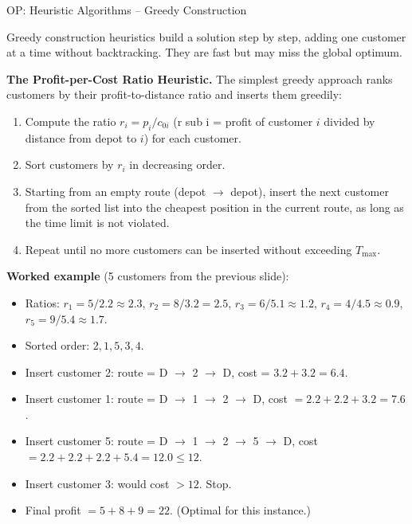 \documentclass[aspectratio=169,10pt]{beamer}
\begin{document}
\begin{frame}[allowframebreaks]{OP: Heuristic Algorithms -- Greedy Construction}

  Greedy construction heuristics build a solution step by step, adding
  one customer at a time without backtracking.
  They are fast but may miss the global optimum.

  \medskip
  \textbf{The Profit-per-Cost Ratio Heuristic.}
  The simplest greedy approach ranks customers by their profit-to-distance
  ratio and inserts them greedily:

  \medskip
  \begin{enumerate}
    \item Compute the ratio $r_i = p_i / c_{0i}$ (r sub i = profit of
          customer $i$ divided by distance from depot to $i$) for each
          customer.
    \item Sort customers by $r_i$ in decreasing order.
    \item Starting from an empty route (depot $\to$ depot), insert the
          next customer from the sorted list into the cheapest position
          in the current route, as long as the time limit is not violated.
    \item Repeat until no more customers can be inserted without
          exceeding $T_{\max}$.
  \end{enumerate}

  \medskip
  \textbf{Worked example} (5 customers from the previous slide):
  \begin{itemize}
    \item Ratios: $r_1 = 5/2.2 \approx 2.3$,\;
                  $r_2 = 8/3.2 = 2.5$,\;
                  $r_3 = 6/5.1 \approx 1.2$,\;
                  $r_4 = 4/4.5 \approx 0.9$,\;
                  $r_5 = 9/5.4 \approx 1.7$.
    \item Sorted order: $2, 1, 5, 3, 4$.
    \item Insert customer 2: route = D $\to$ 2 $\to$ D, cost = $3.2 + 3.2 = 6.4$.
    \item Insert customer 1: route = D $\to$ 1 $\to$ 2 $\to$ D,
          cost $= 2.2 + 2.2 + 3.2 = 7.6$.
    \item Insert customer 5: route = D $\to$ 1 $\to$ 2 $\to$ 5 $\to$ D,
          cost $= 2.2 + 2.2 + 2.2 + 5.4 = 12.0 \le 12$. \checkmark
    \item Insert customer 3: would cost $> 12$. Stop.
    \item Final profit $= 5 + 8 + 9 = 22$. (Optimal for this instance.)
  \end{itemize}

\end{frame}
\end{document}
